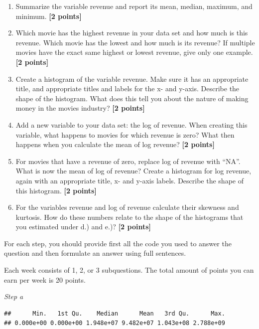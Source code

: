 \documentclass[
]{article}
\newenvironment{Shaded}{\begin{snugshade}}{\end{snugshade}}
\newcommand{\FunctionTok}[1]{\textcolor[rgb]{0.13,0.29,0.53}{\textbf{#1}}}
\newcommand{\NormalTok}[1]{#1}
\newcommand{\SpecialCharTok}[1]{\textcolor[rgb]{0.81,0.36,0.00}{\textbf{#1}}}
\providecommand{\tightlist}{%
  \setlength{\itemsep}{0pt}\setlength{\parskip}{0pt}}
\begin{document}
\begin{enumerate}
\def\labelenumi{\alph{enumi}.}
\tightlist
\item
  Summarize the variable revenue and report its mean, median, maximum,
  and minimum. \textbf{[2 points]}
\item
  Which movie has the highest revenue in your data set and how much is
  this revenue. Which movie has the lowest and how much is its revenue?
  If multiple movies have the exact same highest or lowest revenue, give
  only one example. \textbf{[2 points]}
\item
  Create a histogram of the variable revenue. Make sure it has an
  appropriate title, and appropriate titles and labels for the x- and
  y-axis. Describe the shape of the histogram. What does this tell you
  about the nature of making money in the movies industry?
  \textbf{[2 points]}
\item
  Add a new variable to your data set: the log of revenue. When creating
  this variable, what happens to movies for which revenue is zero? What
  then happens when you calculate the mean of log revenue?
  \textbf{[2 points]}
\item
  For movies that have a revenue of zero, replace log of revenue with
  ``NA''. What is now the mean of log of revenue? Create a histogram for
  log revenue, again with an appropriate title, x- and y-axis labels.
  Describe the shape of this histogram. \textbf{[2 points]}
\item
  For the variables revenue and log of revenue calculate their skewness
  and kurtosis. How do these numbers relate to the shape of the
  histograms that you estimated under d.) and e.)? \textbf{[2 points]}
\end{enumerate}

For each step, you should provide first all the code you used to answer
the question and then formulate an answer using full sentences.

Each week consists of 1, 2, or 3 subquestions. The total amount of
points you can earn per week is 20 points.

\emph{Step a}

\begin{Shaded}
\end{Shaded}

\begin{verbatim}
##      Min.   1st Qu.    Median      Mean   3rd Qu.      Max. 
## 0.000e+00 0.000e+00 1.948e+07 9.482e+07 1.043e+08 2.788e+09
\end{verbatim}
\end{document}
